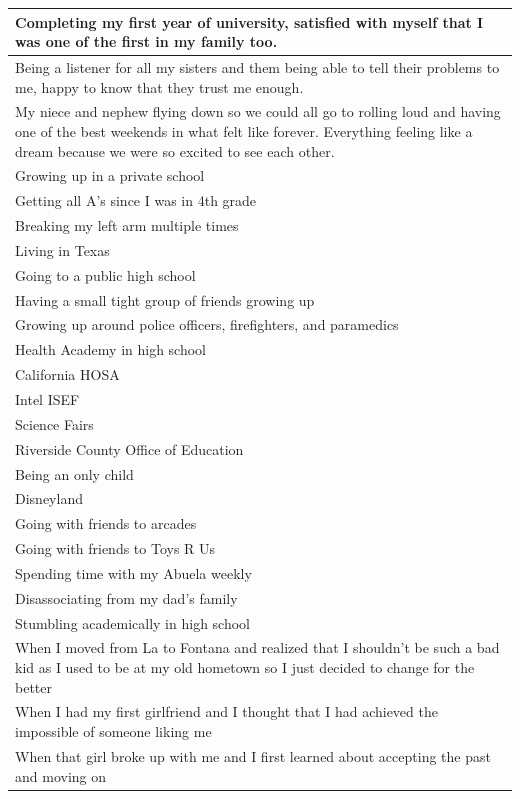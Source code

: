 \documentclass[
  .7em,
  letterpaper,
  DIV=11,
  numbers=noendperiod]{scrartcl}
\begin{document}
\begin{table}
\begin{tabular}{l}
\hline
Completing my first year of university, satisfied with myself that I was one of the first in my family too.\\
\hline
Being a listener for all my sisters and them being able to tell their problems to me, happy to know that they trust me enough.\\
\hline
My niece and nephew flying down so we could all go to rolling loud and having one of the best weekends in what felt like forever. Everything feeling like a dream because we were so excited to see each other.\\
\hline
Growing up in a private school\\
\hline
Getting all A’s since I was in 4th grade\\
\hline
Breaking my left arm multiple times\\
\hline
Living in Texas\\
\hline
Going to a public high school\\
\hline
Having a small tight group of friends growing up\\
\hline
Growing up around police officers, firefighters, and paramedics\\
\hline
Health Academy in high school\\
\hline
California HOSA\\
\hline
Intel ISEF\\
\hline
Science Fairs\\
\hline
Riverside County Office of Education\\
\hline
Being an only child\\
\hline
Disneyland\\
\hline
Going with friends to arcades\\
\hline
Going with friends to Toys R Us\\
\hline
Spending time with my Abuela weekly\\
\hline
Disassociating from my dad’s family\\
\hline
Stumbling academically in high school\\
\hline
When I moved from La to Fontana and realized that I shouldn’t be such a bad kid as I used to be at my old hometown so I just decided to change for the better\\
\hline
When I had my first girlfriend and I thought that I had achieved the impossible of someone liking me\\
\hline
When that girl broke up with me and I first learned about accepting the past and moving on\\
\hline

\end{tabular}
\end{table}
\end{document}
